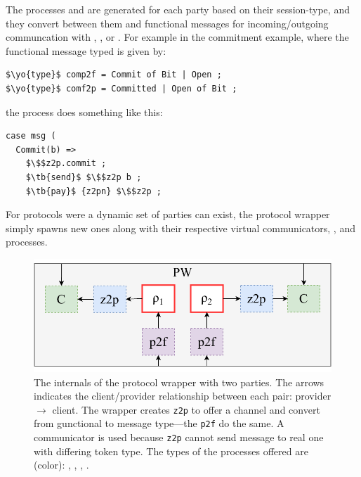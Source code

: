 The processes  and  are generated for each party based on their session-type, and they convert between them and functional messages for incoming/outgoing communcation with \Z, \F, or \A. 
For example in the commitment example, where the functional message typed is given by: 
\begin{lstlisting}[basicstyle=\small\BeraMonottFamily, mathescape]
$\yo{type}$ comp2f = Commit of Bit | Open ;
$\yo{type}$ comf2p = Committed | Open of Bit ;
\end{lstlisting}
the  process does something like this: 
\begin{lstlisting}[basicstyle=\small\BeraMonottFamily, frame=single, mathescape]
case msg (
  Commit(b) =>
    $\$$z2p.commit ;
    $\tb{send}$ $\$$z2p b ;
    $\tb{pay}$ {z2pn} $\$$z2p ;
\end{lstlisting}
For protocols were a dynamic set of parties can exist, the protocol wrapper simply spawns new ones along with their respective virtual communicators, , and  processes.

\begin{figure}
\centering
\includegraphics[scale=0.5]{figures/blankpartywrapper2.pdf}
\caption{The internals of the protocol wrapper with two parties. The arrows indicates the client/provider relationship between each pair: provider $\rightarrow$ client. The wrapper creates \texttt{z2p} to offer a channel and convert from gunctional to message type---the \texttt{p2f} do the same. A communicator is used because \texttt{z2p} cannot send message to real one with differing token type. The types of the processes offered are (color): , , , . }
\label{fig:blankpartywrapper}
\vspace{-1.5em}
\end{figure}

